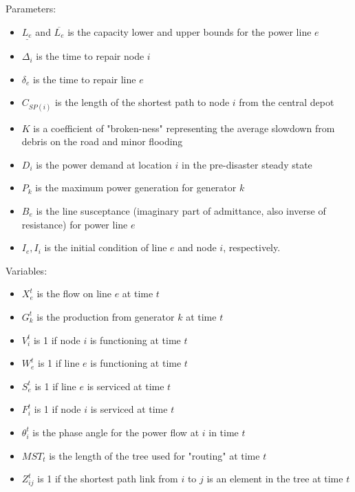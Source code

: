 \documentclass{article}
\begin{document}
Parameters:
	\begin{itemize}
		\item $\underline{L_e}$ and $\overline{L_e}$ is the capacity lower and upper bounds for the power line $e$
		\item $\Delta_{i}$ is the time to repair node $i$
		\item $\delta_{e}$ is the time to repair line $e$
		\item $C_{SP(i)}$ is the length of the shortest path to node $i$ from the central depot
		\item $K$ is a coefficient of "broken-ness" representing the average slowdown from debris on the road and minor flooding
		\item $D_i$ is the power demand at location $i$ in the pre-disaster steady state
		\item $P_k$ is the maximum power generation for generator $k$
		\item $B_e$ is the line susceptance (imaginary part of admittance, also inverse of resistance) for power line $e$
		\item $I_e, I_i$ is the initial condition of line $e$ and node $i$, respectively.
	\end{itemize}

Variables:
	\begin{itemize}
		\item $X_{e}^{t}$ is the flow on line $e$ at time $t$
		\item $G_{k}^t$ is the production from generator $k$ at time $t$
		\item $V_i^t$ is 1 if node $i$ is functioning at time $t$
		\item $W_{e}^t$ is 1 if line $e$ is functioning at time $t$
		\item $S_{e}^t$ is 1 if line $e$ is serviced at time $t$
		\item $F_i^t$ is 1 if node $i$ is serviced at time $t$ 
		\item $\theta_i^t$ is the phase angle for the power flow at $i$ in time $t$
		\item $MST_t$ is the length of the tree used for "routing" at time $t$
		\item $Z_{ij}^t$ is 1 if the shortest path link from $i$ to $j$ is an element in the tree at time $t$	
	\end{itemize}
	
\end{document}
